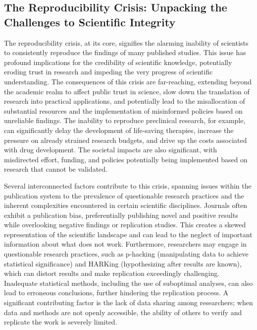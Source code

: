 \documentclass{article}
\begin{document}
\subsection{The Reproducibility Crisis: Unpacking the Challenges to Scientific Integrity}

The reproducibility crisis, at its core, signifies the alarming inability of scientists to consistently reproduce the findings of many published studies. This issue has profound implications for the credibility of scientific knowledge, potentially eroding trust in research and impeding the very progress of scientific understanding. The consequences of this crisis are far-reaching, extending beyond the academic realm to affect public trust in science, slow down the translation of research into practical applications, and potentially lead to the misallocation of substantial resources and the implementation of misinformed policies based on unreliable findings. The inability to reproduce preclinical research, for example, can significantly delay the development of life-saving therapies, increase the pressure on already strained research budgets, and drive up the costs associated with drug development. The societal impacts are also significant, with misdirected effort, funding, and policies potentially being implemented based on research that cannot be validated.

Several interconnected factors contribute to this crisis, spanning issues within the publication system to the prevalence of questionable research practices and the inherent complexities encountered in certain scientific disciplines. Journals often exhibit a publication bias, preferentially publishing novel and positive results while overlooking negative findings or replication studies. This creates a skewed representation of the scientific landscape and can lead to the neglect of important information about what does not work. Furthermore, researchers may engage in questionable research practices, such as p-hacking (manipulating data to achieve statistical significance) and HARKing (hypothesizing after results are known), which can distort results and make replication exceedingly challenging. Inadequate statistical methods, including the use of suboptimal analyses, can also lead to erroneous conclusions, further hindering the replication process. A significant contributing factor is the lack of data sharing among researchers; when data and methods are not openly accessible, the ability of others to verify and replicate the work is severely limited.
\end{document}
